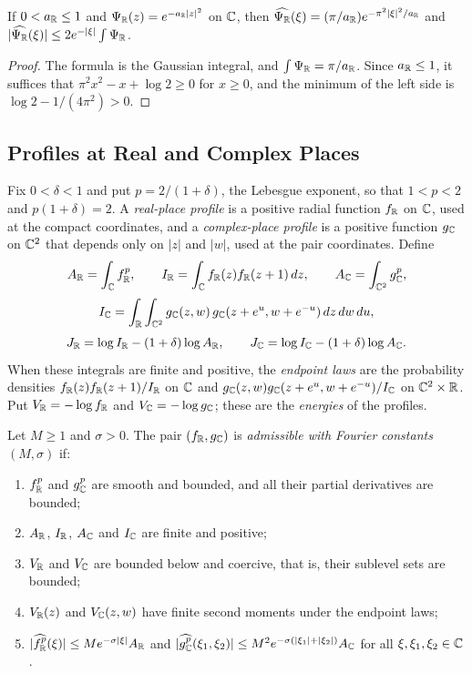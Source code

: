 \begin{lemma}\label{geo:gaussian}
If $0<a_\mathbb R\le1$ and $\Psi_\mathbb R(z)=e^{-a_\mathbb R|z|^2}$ on $\mathbb C$, then
$\widehat{\Psi_\mathbb R}(\xi)=(\pi/a_\mathbb R)e^{-\pi^2|\xi|^2/a_\mathbb R}$ and
$|\widehat{\Psi_\mathbb R}(\xi)|\le2e^{-|\xi|}\int\Psi_\mathbb R$.
\end{lemma}

\begin{proof}
The formula is the Gaussian integral, and $\int\Psi_\mathbb R=\pi/a_\mathbb R$. Since
$a_\mathbb R\le1$, it suffices that $\pi^2x^2-x+\log2\ge0$ for $x\ge0$, and the
minimum of the left side is $\log2-1/(4\pi^2)>0$.
\end{proof}

\subsection{Profiles at Real and Complex Places}
Fix $0<\delta<1$ and put $p=2/(1+\delta)$, the Lebesgue exponent, so
that $1<p<2$ and $p(1+\delta)=2$. A \emph{real-place profile} is a
positive radial function $f_\mathbb R$ on $\mathbb C$, used at the compact
coordinates, and a \emph{complex-place profile} is a positive function
$g_\mathbb C$ on $\mathbb C^2$ that depends only on $|z|$ and $|w|$, used at the pair
coordinates. Define
\[
 A_\mathbb R=\int_\mathbb C f_\mathbb R^p,\qquad I_\mathbb R=\int_\mathbb C f_\mathbb R(z)f_\mathbb R(z+1)\,dz,
 \qquad A_\mathbb C=\int_{\mathbb C^2}g_\mathbb C^p,
\]
\[
 I_\mathbb C=\int_\mathbb R\int_{\mathbb C^2}g_\mathbb C(z,w)\,g_\mathbb C(z+e^u,w+e^{-u})\,dz\,dw\,du,
\]
\[
 J_\mathbb R=\log I_\mathbb R-(1+\delta)\log A_\mathbb R,\qquad
 J_\mathbb C=\log I_\mathbb C-(1+\delta)\log A_\mathbb C.
\]
When these integrals are finite and positive, the \emph{endpoint laws}
are the probability densities $f_\mathbb R(z)f_\mathbb R(z+1)/I_\mathbb R$ on $\mathbb C$ and
$g_\mathbb C(z,w)g_\mathbb C(z+e^u,w+e^{-u})/I_\mathbb C$ on $\mathbb C^2\times\mathbb R$. Put
$V_\mathbb R=-\log f_\mathbb R$ and $V_\mathbb C=-\log g_\mathbb C$; these are the \emph{energies} of
the profiles.

\begin{definition}\label{geo:admissible}
Let $M\ge1$ and $\sigma>0$. The pair $(f_\mathbb R,g_\mathbb C)$ is \emph{admissible
with Fourier constants $(M,\sigma)$} if:
\begin{enumerate}
\item[(P1)] $f_\mathbb R^p$ and $g_\mathbb C^p$ are smooth and bounded, and all their
partial derivatives are bounded;
\item[(P2)] $A_\mathbb R$, $I_\mathbb R$, $A_\mathbb C$ and $I_\mathbb C$ are finite and positive;
\item[(P3)] $V_\mathbb R$ and $V_\mathbb C$ are bounded below and coercive, that is,
their sublevel sets are bounded;
\item[(P4)] $V_\mathbb R(z)$ and $V_\mathbb C(z,w)$ have finite second moments under
the endpoint laws;
\item[(P5)] $|\widehat{f_\mathbb R^p}(\xi)|\le Me^{-\sigma|\xi|}A_\mathbb R$ and
$|\widehat{g_\mathbb C^p}(\xi_1,\xi_2)|\le M^2e^{-\sigma(|\xi_1|+|\xi_2|)}A_\mathbb C$
for all $\xi,\xi_1,\xi_2\in\mathbb C$.
\end{enumerate}
\end{definition}

